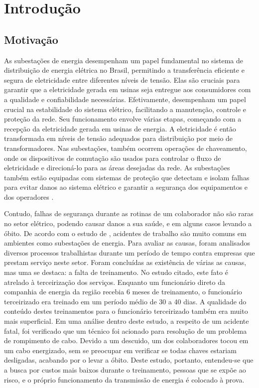 \chapter{Introdução}

\section{Motivação}
\label{sec:motivation}

As subestações de energia desempenham um papel fundamental no sistema de distribuição de energia elétrica no Brasil, permitindo a transferência eficiente e segura de eletricidade entre diferentes níveis de tensão. Elas são cruciais para garantir que a eletricidade gerada em usinas seja entregue aos consumidores com a qualidade e confiabilidade necessárias. Efetivamente, desempenham um papel crucial na estabilidade do sistema elétrico, facilitando a manutenção, controle e proteção da rede. Seu funcionamento envolve várias etapas, começando com a recepção da eletricidade gerada em usinas de energia. A eletricidade é então transformada em níveis de tensão adequados para distribuição por meio de transformadores. Nas subestações, também ocorrem operações de chaveamento, onde os dispositivos de comutação são usados para controlar o fluxo de eletricidade e direcioná-lo para as áreas desejadas da rede. As subestações também estão equipadas com sistemas de proteção que detectam e isolam falhas para evitar danos ao sistema elétrico e garantir a segurança dos equipamentos e dos operadores \cite {randolph2013electric}.

Contudo, falhas de segurança durante as rotinas de um colaborador não são raras no setor elétrico, podendo causar danos a sua saúde, e em alguns casos levando a óbito. De acordo com o estudo de \cite{lima2021precarizaccao}, acidentes de trabalho são muito comuns em ambientes como subestações de energia. Para avaliar as causas, foram analisados diversos processos trabalhistas durante um período de tempo contra empresas que prestam serviço neste setor. Foram concluídas as existência de várias as causas, mas uma se destaca: a falta de treinamento. No estudo citado, este fato é atrelado à terceirização dos serviços. Enquanto um funcionário direto da companhia de energia da região recebia 6 meses de treinamento, o funcionário terceirizado era treinado em um período médio de 30 a 40 dias. A qualidade do conteúdo destes treinamentos para o funcionário terceirizado também era muito mais superficial. Em uma análise dentro deste estudo, a respeito de um acidente fatal, foi verificado que um técnico foi acionado para resolução de um problema de rompimento de cabo. Devido a um descuido, um dos colaboradores tocou em um cabo energizado, sem se preocupar em verificar se todas chaves estariam desligadas, acabando por o levar a óbito. Deste estudo, portanto, entendeu-se que a busca por custos mais baixos durante o treinamento, pessoas que se expõe ao risco, e o próprio funcionamento da transmissão de energia é colocado à prova. 

